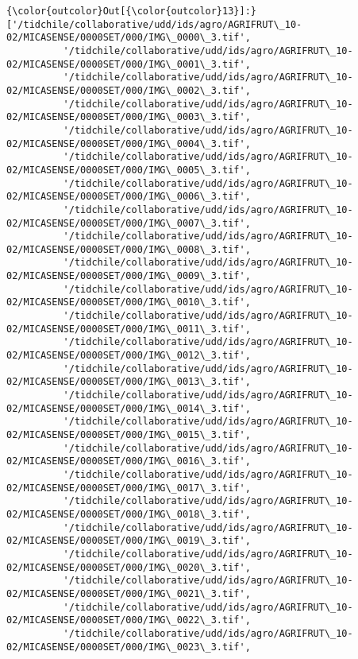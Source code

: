 \documentclass[11pt]{article}
\begin{document}
\begin{Verbatim}[commandchars=\\\{\}]
{\color{outcolor}Out[{\color{outcolor}13}]:} ['/tidchile/collaborative/udd/ids/agro/AGRIFRUT\_10-02/MICASENSE/0000SET/000/IMG\_0000\_3.tif',
          '/tidchile/collaborative/udd/ids/agro/AGRIFRUT\_10-02/MICASENSE/0000SET/000/IMG\_0001\_3.tif',
          '/tidchile/collaborative/udd/ids/agro/AGRIFRUT\_10-02/MICASENSE/0000SET/000/IMG\_0002\_3.tif',
          '/tidchile/collaborative/udd/ids/agro/AGRIFRUT\_10-02/MICASENSE/0000SET/000/IMG\_0003\_3.tif',
          '/tidchile/collaborative/udd/ids/agro/AGRIFRUT\_10-02/MICASENSE/0000SET/000/IMG\_0004\_3.tif',
          '/tidchile/collaborative/udd/ids/agro/AGRIFRUT\_10-02/MICASENSE/0000SET/000/IMG\_0005\_3.tif',
          '/tidchile/collaborative/udd/ids/agro/AGRIFRUT\_10-02/MICASENSE/0000SET/000/IMG\_0006\_3.tif',
          '/tidchile/collaborative/udd/ids/agro/AGRIFRUT\_10-02/MICASENSE/0000SET/000/IMG\_0007\_3.tif',
          '/tidchile/collaborative/udd/ids/agro/AGRIFRUT\_10-02/MICASENSE/0000SET/000/IMG\_0008\_3.tif',
          '/tidchile/collaborative/udd/ids/agro/AGRIFRUT\_10-02/MICASENSE/0000SET/000/IMG\_0009\_3.tif',
          '/tidchile/collaborative/udd/ids/agro/AGRIFRUT\_10-02/MICASENSE/0000SET/000/IMG\_0010\_3.tif',
          '/tidchile/collaborative/udd/ids/agro/AGRIFRUT\_10-02/MICASENSE/0000SET/000/IMG\_0011\_3.tif',
          '/tidchile/collaborative/udd/ids/agro/AGRIFRUT\_10-02/MICASENSE/0000SET/000/IMG\_0012\_3.tif',
          '/tidchile/collaborative/udd/ids/agro/AGRIFRUT\_10-02/MICASENSE/0000SET/000/IMG\_0013\_3.tif',
          '/tidchile/collaborative/udd/ids/agro/AGRIFRUT\_10-02/MICASENSE/0000SET/000/IMG\_0014\_3.tif',
          '/tidchile/collaborative/udd/ids/agro/AGRIFRUT\_10-02/MICASENSE/0000SET/000/IMG\_0015\_3.tif',
          '/tidchile/collaborative/udd/ids/agro/AGRIFRUT\_10-02/MICASENSE/0000SET/000/IMG\_0016\_3.tif',
          '/tidchile/collaborative/udd/ids/agro/AGRIFRUT\_10-02/MICASENSE/0000SET/000/IMG\_0017\_3.tif',
          '/tidchile/collaborative/udd/ids/agro/AGRIFRUT\_10-02/MICASENSE/0000SET/000/IMG\_0018\_3.tif',
          '/tidchile/collaborative/udd/ids/agro/AGRIFRUT\_10-02/MICASENSE/0000SET/000/IMG\_0019\_3.tif',
          '/tidchile/collaborative/udd/ids/agro/AGRIFRUT\_10-02/MICASENSE/0000SET/000/IMG\_0020\_3.tif',
          '/tidchile/collaborative/udd/ids/agro/AGRIFRUT\_10-02/MICASENSE/0000SET/000/IMG\_0021\_3.tif',
          '/tidchile/collaborative/udd/ids/agro/AGRIFRUT\_10-02/MICASENSE/0000SET/000/IMG\_0022\_3.tif',
          '/tidchile/collaborative/udd/ids/agro/AGRIFRUT\_10-02/MICASENSE/0000SET/000/IMG\_0023\_3.tif',

\end{Verbatim}
\end{document}
